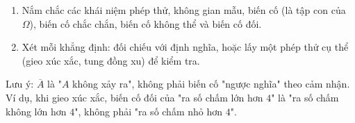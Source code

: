 \begin{enumerate}
\item Nắm chắc các khái niệm phép thử, không gian mẫu, biến cố (là tập con của $\Omega$), biến cố chắc chắn, biến cố không thể và biến cố đối.
\item Xét mỗi khẳng định: đối chiếu với định nghĩa, hoặc lấy một phép thử cụ thể (gieo xúc xắc, tung đồng xu) để kiểm tra.
\end{enumerate}
Lưu ý: $\overline{A}$ là "$A$ không xảy ra", không phải biến cố "ngược nghĩa" theo cảm nhận. Ví dụ, khi gieo xúc xắc, biến cố đối của "ra số chấm lớn hơn $4$" là "ra số chấm không lớn hơn $4$", không phải "ra số chấm nhỏ hơn $4$".
